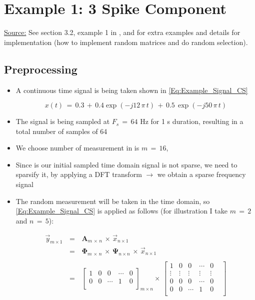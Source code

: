 \documentclass[12pt,a4paper]{book}
\begin{document}
\section{Example 1: 3 Spike Component}


\underline{Source:} See section 3.2, example 1 in \cite{paper_tutorial_sparse_Stankovic}, and \cite{paper_numerical_toor} for extra examples and details for implementation (how to implement random matrices and do random selection).

\subsection{Preprocessing}

\begin{itemize}

\item A continuous time signal is being taken shown in \autoref{Eq:Example_Signal_CS}

\begin{equation}
    x(t) \, = \, 0.3 \, + \, 0.4 \exp(-j 12 \, \pi \, t) \, + \, 0.5 \, \exp(-j 50 \, \pi \, t)
    \label{Eq:Example_Signal_CS}
\end{equation}

\item The signal is being sampled at $F_s \, = \, 64$ Hz for 1 s duration, resulting in a total number of samples of 64

\item We choose number of measurement in  is $m \, = \, 16$,  

\item Since is our initial sampled time domain signal is not sparse, we need to sparsify it, by applying a DFT transform $\rightarrow$ we obtain a sparse frequency signal

\item The random measurement will be taken in the time domain, so \autoref{Eq:Example_Signal_CS} is applied as follows (for illustration I take $m \, = \, 2$ and $n \, = \, 5$):

\begin{equation}
\begin{array}{lll}
 \Vec{y}_{m \times 1} \, &=& \, \boldsymbol A_{m \, \times \, n} \,\times \,  \Vec{x}_{n \times 1} \\ 
		 &=& \, \boldsymbol \Phi_{m \, \times \, n} \, \times \, \boldsymbol \Psi_{n \times n} \, \times \, \Vec{x}_{n \times 1} \\ \\
		 &=& \, \begin{bmatrix}
		 1 & 0 & 0 & \cdots & 0 \\
		 0 & 0 & \cdots & 1 & 0 \\
		 \end{bmatrix}_{m \times n}
		 \times \, \begin{bmatrix}
		 1 & 0 & 0 & \cdots & 0 \\
		 \vdots & \vdots & \vdots & \vdots & \vdots & \\
		 0 & 0 & 0 & \cdots & 0 \\
		 0 & 0 & \cdots & 1 & 0 \\
		 

\end{bmatrix}
\end{array}
\end{equation}
\end{itemize}
\end{document}

